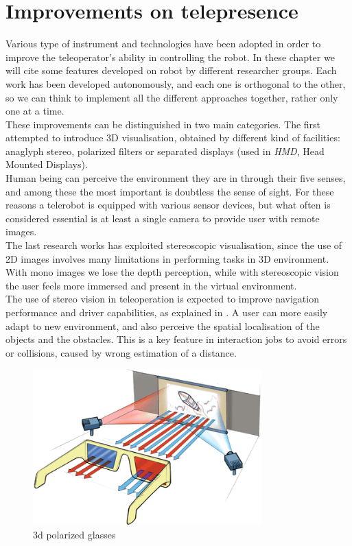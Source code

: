 \section{Improvements on telepresence}
\label{intro:improvements_telepresence}

Various type of instrument and technologies have been adopted in order
to improve the teleoperator's ability in controlling the robot. In
these chapter we will cite some features developed on \morduc{}
robot by different researcher groups. Each work has been developed
autonomously, and each one is orthogonal to the other, so we can think
to implement all the different approaches together, rather only one
at a time.
\\
These improvements can be distinguished in two main categories. The
first attempted to introduce 3D visualisation, obtained by different
kind of facilities: anaglyph stereo, polarized filters or separated
displays (used in \textit{HMD}, Head Mounted Displays).
\\
Human being can perceive the environment they are in through their
five senses, and among these the most important is doubtless the sense
of sight.
For these reasons a telerobot is equipped with various sensor devices,
but what often is considered essential is at least a single camera to
provide user with remote images.
\\
The last research works has exploited stereoscopic visualisation, since
the use of 2D images involves many limitations in performing tasks
in 3D environment. With mono images we lose the depth perception,
while with stereoscopic vision the user feels more immersed and
present in the virtual environment.
\\
The use of stereo vision in teleoperation is expected
to improve navigation performance and driver capabilities, as explained in
\cite{morduc:neri}. A user can more easily adapt to new environment, and
also perceive the spatial localisation of the objects and the obstacles.
This is a key feature in interaction jobs to avoid errors or collisions,
caused by wrong estimation of a distance.

\begin{figure} [!h]
  \begin{center}
    \includegraphics[width=250pt]{img/3d-glasses.png}
    \caption{3d polarized glasses}
    \label{fig:3d-glasses}
  \end{center}
\end{figure}

